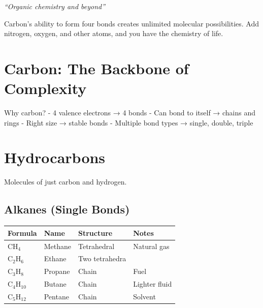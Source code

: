 \documentclass[
  11pt,
  letterpaper,
  twoside,
  openright]{book}
\begin{document}
\emph{``Organic chemistry and beyond''}

\begin{tcolorbox}[enhanced jigsaw, leftrule=.75mm, title=\textcolor{quarto-callout-note-color}{\faInfo}\hspace{0.5em}{Key Revelation}, bottomrule=.15mm, opacityback=0, coltitle=black, arc=.35mm, colframe=quarto-callout-note-color-frame, colbacktitle=quarto-callout-note-color!10!white, colback=white, titlerule=0mm, breakable, bottomtitle=1mm, toptitle=1mm, rightrule=.15mm, toprule=.15mm, left=2mm, opacitybacktitle=0.6]

Carbon's ability to form four bonds creates unlimited molecular
possibilities. Add nitrogen, oxygen, and other atoms, and you have the
chemistry of life.

\end{tcolorbox}

\section{Carbon: The Backbone of
Complexity}\label{carbon-the-backbone-of-complexity}

Why carbon? - 4 valence electrons → 4 bonds - Can bond to itself →
chains and rings - Right size → stable bonds - Multiple bond types →
single, double, triple

\section{Hydrocarbons}\label{hydrocarbons}

Molecules of just carbon and hydrogen.

\subsection{Alkanes (Single Bonds)}\label{alkanes-single-bonds}

\begin{longtable}[]{@{}llll@{}}
\toprule\noalign{}
Formula & Name & Structure & Notes \\
\midrule\noalign{}
\endhead
\bottomrule\noalign{}
\endlastfoot
\(\text{CH}_4\) & Methane & Tetrahedral & Natural gas \\
\(\text{C}_2\text{H}_6\) & Ethane & Two tetrahedra & \\
\(\text{C}_3\text{H}_8\) & Propane & Chain & Fuel \\
\(\text{C}_4\text{H}_{10}\) & Butane & Chain & Lighter fluid \\
\(\text{C}_5\text{H}_{12}\) & Pentane & Chain & Solvent \\
\end{longtable}
\end{document}
